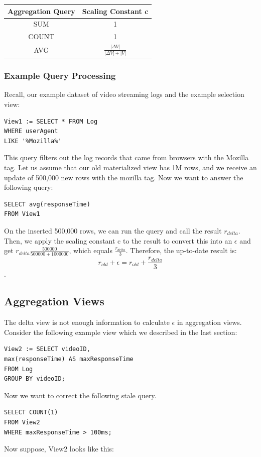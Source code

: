 \begin{center}
\begin{tabular}{|c|c|}
\hline 
Aggregation Query & Scaling Constant c\tabularnewline
\hline 
\hline 
SUM & 1\tabularnewline
\hline 
COUNT & 1\tabularnewline
\hline 
AVG & $\frac{|\Delta V|}{|\Delta V|+|V|}$\tabularnewline
\hline 
\end{tabular}
\par\end{center}

\subsubsection{Example Query Processing}
Recall, our example dataset of video streaming logs and the example
selection view:
\begin{lstlisting}
View1 := SELECT * FROM Log 
WHERE userAgent 
LIKE '%Mozilla%'
\end{lstlisting}
This query filters out the log records that came from browsers with the Mozilla tag.
Let us assume that our old materialized view has 1M rows, and 
we receive an update of 500,000 new rows with the mozilla tag.
Now we want to answer the following query:
\begin{lstlisting}
SELECT avg(responseTime) 
FROM View1
\end{lstlisting}
On the inserted 500,000 rows, we can run the query and call the result $r_{delta}$.
Then, we apply the scaling constant c to the result to convert this into an $\epsilon$ and get $r_{delta}\frac{500000}{500000+1000000}$, which 
equals $\frac{r_{delta}}{3}$.
Therefore, the up-to-date result is:
\[r_{old} + \epsilon = r_{old} +\frac{r_{delta}}{3}\].

\subsection{Aggregation Views}
The delta view is not enough information to calculate $\epsilon$ in aggregation views. 
Consider the following example view which we described in the last section:
\begin{lstlisting}
View2 := SELECT videoID, 
max(responseTime) AS maxResponseTime 
FROM Log
GROUP BY videoID;
\end{lstlisting}
Now we want to correct the following stale query.
\begin{lstlisting}
SELECT COUNT(1) 
FROM View2 
WHERE maxResponseTime > 100ms;
\end{lstlisting}
Now suppose, View2 looks like this:

